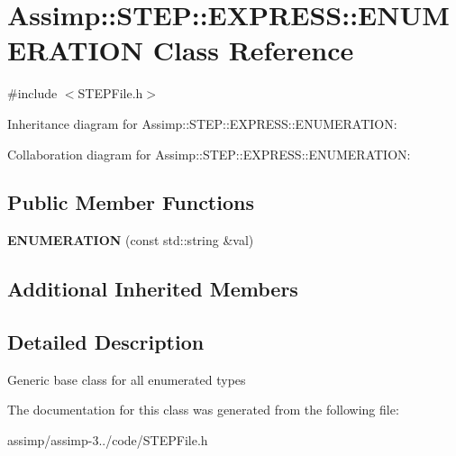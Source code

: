 \hypertarget{class_assimp_1_1_s_t_e_p_1_1_e_x_p_r_e_s_s_1_1_e_n_u_m_e_r_a_t_i_o_n}{\section{Assimp\+:\+:S\+T\+E\+P\+:\+:E\+X\+P\+R\+E\+S\+S\+:\+:E\+N\+U\+M\+E\+R\+A\+T\+I\+O\+N Class Reference}
\label{class_assimp_1_1_s_t_e_p_1_1_e_x_p_r_e_s_s_1_1_e_n_u_m_e_r_a_t_i_o_n}
}


{\ttfamily \#include $<$S\+T\+E\+P\+File.\+h$>$}



Inheritance diagram for Assimp\+:\+:S\+T\+E\+P\+:\+:E\+X\+P\+R\+E\+S\+S\+:\+:E\+N\+U\+M\+E\+R\+A\+T\+I\+O\+N\+:


Collaboration diagram for Assimp\+:\+:S\+T\+E\+P\+:\+:E\+X\+P\+R\+E\+S\+S\+:\+:E\+N\+U\+M\+E\+R\+A\+T\+I\+O\+N\+:
\subsection*{Public Member Functions}
\begin{DoxyCompactItemize}
\item 
\hypertarget{class_assimp_1_1_s_t_e_p_1_1_e_x_p_r_e_s_s_1_1_e_n_u_m_e_r_a_t_i_o_n_aca3812e4437ab5bcbfad0ba50fe089d2}{{\bfseries E\+N\+U\+M\+E\+R\+A\+T\+I\+O\+N} (const std\+::string \&val)}\label{class_assimp_1_1_s_t_e_p_1_1_e_x_p_r_e_s_s_1_1_e_n_u_m_e_r_a_t_i_o_n_aca3812e4437ab5bcbfad0ba50fe089d2}

\end{DoxyCompactItemize}
\subsection*{Additional Inherited Members}


\subsection{Detailed Description}
Generic base class for all enumerated types 

The documentation for this class was generated from the following file\+:\begin{DoxyCompactItemize}
\item 
assimp/assimp-\/3../code/S\+T\+E\+P\+File.\+h\end{DoxyCompactItemize}
